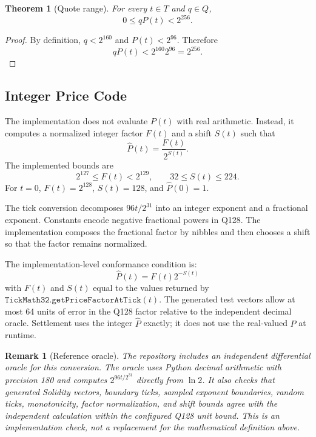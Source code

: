 \documentclass[11pt]{article}
\newtheorem{theorem}{Theorem}
\newtheorem{remark}{Remark}
\begin{document}
\begin{theorem}[Quote range]
For every \(t\in T\) and \(q\in Q\),
\[
  0 \le qP(t) < 2^{256}.
\]
\end{theorem}

\begin{proof}
By definition, \(q < 2^{160}\) and \(P(t)<2^{96}\).  Therefore
\[
  qP(t) < 2^{160}2^{96}=2^{256}.
\]
\end{proof}

\subsection{Integer Price Code}

The implementation does not evaluate \(P(t)\) with real arithmetic.
Instead, it computes a normalized integer factor \(F(t)\) and a shift
\(S(t)\) such that
\[
  \widehat{P}(t)=\frac{F(t)}{2^{S(t)}}.
\]
The implemented bounds are
\[
  2^{127} \le F(t) < 2^{129},
  \qquad
  32 \le S(t) \le 224.
\]
For \(t=0\), \(F(t)=2^{128}\), \(S(t)=128\), and
\(\widehat{P}(0)=1\).

The tick conversion decomposes \(96t/2^{31}\) into an integer exponent
and a fractional exponent.  Constants encode negative fractional powers
in Q128.  The implementation composes the fractional factor by nibbles
and then chooses a shift so that the factor remains normalized.

The implementation-level conformance condition is:
\[
  \widehat{P}(t)=F(t)2^{-S(t)}
\]
with \(F(t)\) and \(S(t)\) equal to the values returned by
\(\mathtt{TickMath32.getPriceFactorAtTick}(t)\).  The generated test
vectors allow at most 64 units of error in the Q128 factor relative to
the independent decimal oracle.  Settlement uses the integer
\(\widehat{P}\) exactly; it does not use the real-valued \(P\) at
runtime.

\begin{remark}[Reference oracle]
The repository includes an independent differential oracle for this
conversion.  The oracle uses Python decimal arithmetic with precision
180 and computes \(2^{96t/2^{31}}\) directly from \(\ln 2\).  It also
checks that generated Solidity vectors, boundary ticks, sampled
exponent boundaries, random ticks, monotonicity, factor normalization,
and shift bounds agree with the independent calculation within the
configured Q128 unit bound.  This is an implementation check, not a
replacement for the mathematical definition above.
\end{remark}
\end{document}
